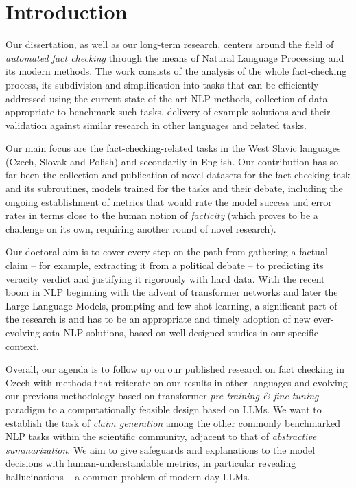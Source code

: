 
\chapter{Introduction}
\label{chap:intro}

Our dissertation, as well as our long-term research, centers around the field of \textit{automated fact checking} through the means of Natural Language Processing and its modern methods.
The work consists of the analysis of the whole fact-checking process, its subdivision and simplification into tasks that can be efficiently addressed using the current state-of-the-art NLP methods, collection of data appropriate to benchmark such tasks, delivery of example solutions and their validation against similar research in other languages and related tasks.

Our main focus are the fact-checking-related tasks in the West Slavic languages (Czech, Slovak and Polish) and secondarily in English.
Our contribution has so far been the collection and publication of novel datasets for the fact-checking task and its subroutines, models trained for the tasks and their debate, including the ongoing establishment of metrics that would rate the model success and error rates in terms close to the human notion of \textit{facticity} (which proves to be a challenge on its own, requiring another round of novel research). 

Our doctoral aim is to cover every step on the path from gathering a factual claim -- for example, extracting it from a political debate -- to predicting its veracity verdict and justifying it rigorously with hard data.
With the recent boom in NLP beginning with the advent of transformer networks and later the Large Language Models, prompting and few-shot learning, a significant part of the research is and has to be an appropriate and timely adoption of new ever-evolving sota NLP solutions, based on well-designed studies in our specific context.

Overall, our agenda is to follow up on our published research on fact checking in Czech with methods that reiterate on our results in other languages and evolving our previous methodology based on transformer \textit{pre-training \& fine-tuning} paradigm to a computationally feasible design based on LLMs. 
We want to establish the task of \textit{claim generation} among the other commonly benchmarked NLP tasks within the scientific community, adjacent to that of \textit{abstractive summarization}.
We aim to give safeguards and explanations to the model decisions with human-understandable metrics, in particular revealing hallucinations -- a common problem of modern day LLMs.

